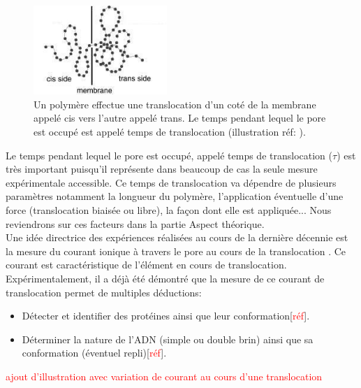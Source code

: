\documentclass[a4paper,11pt]{article}
\begin{document}
\begin{figure}[H]
\begin{center}
\includegraphics[width=0.45\textwidth]{transloc.jpg}

\caption{Un polymère effectue une translocation d'un coté de la membrane appelé cis vers l'autre appelé trans. Le temps pendant lequel le pore est occupé est appelé temps de translocation (illustration réf: \cite{sung}).}
\label{transloc}
\end{center}
\end{figure}



Le temps pendant lequel le pore est occupé, appelé temps de translocation ($\tau$) est très important puisqu'il représente dans beaucoup de cas la seule mesure expérimentale accessible. Ce temps de translocation va dépendre de plusieurs paramètres notamment la longueur du polymère, l'application éventuelle d'une force (translocation biaisée ou libre), la façon dont elle est appliquée... Nous reviendrons sur ces facteurs dans la partie Aspect théorique.\\

 Une idée directrice des expériences réalisées au cours de la dernière décennie est la mesure du courant ionique à travers le pore au cours de la translocation \cite{holesedge}. Ce courant est caractéristique de l'élément en cours de translocation. Expérimentalement, il a déjà été démontré que la mesure de ce courant de translocation permet de multiples déductions:
 \begin{itemize}
 
 
 
 \item Détecter et identifier des protéines ainsi que leur conformation[\textcolor{red}{réf}].
 
  \item Déterminer la nature de l'ADN (simple ou double brin) ainsi que sa conformation (éventuel repli)[\textcolor{red}{réf}].
  
 \end{itemize}
 
 \textcolor{red}{ajout d'illustration avec variation de courant au cours d'une translocation}
 
\end{document}
